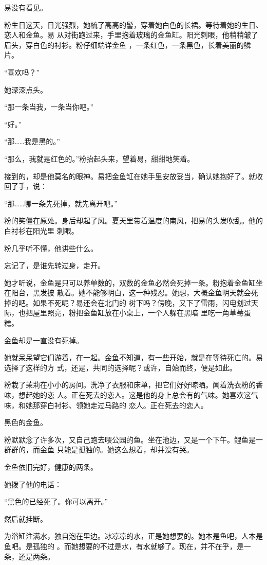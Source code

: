 \documentclass[12pt,a4paper]{article}
\begin{document}
		易没有看见。

		粉生日这天，日光强烈，她梳了高高的髻，穿着她白色的长裙。等待着她的生日、恋人和金鱼。易
	从对街跑过来，手里抱着玻璃的金鱼缸。阳光刺眼，他稍稍皱了眉头，穿白色的衬衫。粉仔细端详金鱼
	，一条红色，一条黑色，长着美丽的鳞片。

		“喜欢吗？”

		她深深点头。

		“那一条当我，一条当你吧。”

		“好。”

		“那……我是黑的。”

		“那么，我就是红色的。”粉抬起头来，望着易，甜甜地笑着。

		接到的，却是他莫名的眼神。易把金鱼缸在她手里安放妥当，确认她抱好了。就收回了手，说：

		“那……哪一条先死掉，就先离开吧。”

		粉的笑僵在原处。身后却起了风。夏天里带着温度的南风，把易的头发吹乱。他的白衬衫在阳光里
	刺眼。

		粉几乎听不懂，他讲些什么。

		忘记了，是谁先转过身，走开。

		她才听说，金鱼是只可以养单数的，双数的金鱼必然会死掉一条。粉抱着金鱼缸坐在阳台，黑发披
	散着。她不能够明白，这一种残忍。她想，大概金鱼明天就会死掉的吧。如果不死呢？易还会在北门的
	树下吗？傍晚，又下了雷雨，闪电划过天际，也把屋里照亮，粉把金鱼缸放在小桌上，一个人躲在黑暗
	里吃一角草莓蛋糕。

		金鱼却是一直没有死掉。

		她就呆呆望它们游着，在一起。金鱼不知道，有一些开始，就是在等待死亡的。易选择了这样的方
	式，还是，共同的选择呢？或许，自始而终，便是如此。

		粉栽了茉莉在小小的房间。洗净了衣服和床单，把它们好好晾晒。闻着洗衣粉的香味，想起她的恋
	人。正在死去的恋人。这是他的身上总会有的气味。她喜欢这气味，和她那穿白衬衫、领她走过马路的
	恋人。正在死去的恋人。

		黑色的金鱼。

		粉默默念了许多次，又自己跑去喂公园的鱼。坐在池边，又是一个下午。鲤鱼是一群群的，而金鱼
	只能是孤独的。她这么想着，却并没有哭。

		金鱼依旧完好，健康的两条。

		她拨了他的电话：

		“黑色的已经死了。你可以离开。”

		然后就挂断。

		为浴缸注满水，独自泡在里边。冰凉凉的水，正是她想要的。她本是鱼吧，人本是鱼吧。是孤独的
	。而她想要的不过是水，有水就够了。现在，并不在乎，是一条，还是两条。
\end{document}
